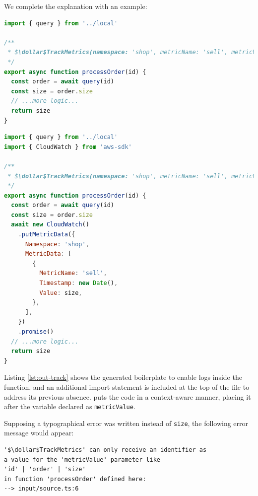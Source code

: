 We complete the explanation with an example:
\begin{lstlisting}[language=javascript, caption={Input code for \annotation{$\dollar$TrackMetrics}}]
import { query } from '../local'

/**
 * $\dollar$TrackMetrics(namespace: 'shop', metricName: 'sell', metricValue: size)
 */
export async function processOrder(id) {
  const order = await query(id)
  const size = order.size
  // ...more logic...
  return size
}
\end{lstlisting}


\begin{lstlisting}[language=javascript, caption={Output code from \annotation{$\dollar$TrackMetrics}}, label={lst:out-track}]
import { query } from '../local'
import { CloudWatch } from 'aws-sdk'

/**
 * $\dollar$TrackMetrics(namespace: 'shop', metricName: 'sell', metricValue: size)
 */
export async function processOrder(id) {
  const order = await query(id)
  const size = order.size
  await new CloudWatch()
    .putMetricData({
      Namespace: 'shop',
      MetricData: [
        {
          MetricName: 'sell',
          Timestamp: new Date(),
          Value: size,
        },
      ],
    })
    .promise()
  // ...more logic...
  return size
}
\end{lstlisting}

Listing \ref{lst:out-track} shows the generated boilerplate to enable logs inside the function,
and an additional import statement is included at the top of the file to address its previous absence.
 puts the code in a context-aware manner,
placing it after the variable declared as \verb|metricValue|.

Supposing a typographical error was written instead of \verb|size|, the following error message would appear:
\begin{lstlisting}[language=console]
'$\dollar$TrackMetrics' can only receive an identifier as
a value for the 'metricValue' parameter like
'id' | 'order' | 'size'
in function 'processOrder' defined here:
--> input/source.ts:6
\end{lstlisting}

